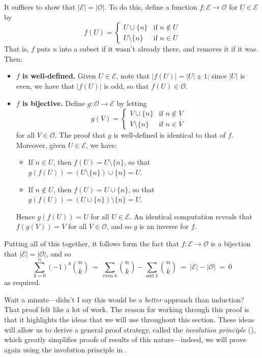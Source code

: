 \begin{cproof}
It suffices to show that $|\mathcal{E}| = |\mathcal{O}|$. To do this, define a function $f : \mathcal{E} \to \mathcal{O}$ for $U \in \mathcal{E}$ by
\[ f(U) = \begin{cases} U \cup \{ n \} & \text{if $n \not\in U$} \\ U \setminus \{ n \} & \text{if $n \in U$} \end{cases} \]
That is, $f$ puts $n$ into a subset if it wasn't already there, and removes it if it was. Then:
\begin{itemize}
\item \textbf{$f$ is well-defined.} Given $U \in \mathcal{E}$, note that $|f(U)| = |U| \pm 1$; since $|U|$ is even, we have that $|f(U)|$ is odd, so that $f(U) \in \mathcal{O}$.
\item \textbf{$f$ is bijective.} Define $g : \mathcal{O} \to \mathcal{E}$ by letting
\[ g(V) = \begin{cases} V \cup \{ n \} & \text{if $n \not\in V$} \\ V \setminus \{ n \} & \text{if $n \in V$} \end{cases} \]
for all $V \in \mathcal{O}$. The proof that $g$ is well-defined is identical to that of $f$. Moreover, given $U \in \mathcal{E}$, we have:
\begin{itemize}
\item If $n \in U$, then $f(U) = U \setminus \{ n \}$, so that $g(f(U)) = (U \setminus \{ n \}) \cup \{ n \} = U$.
\item If $n \not\in U$, then $f(U) = U \cup \{ n \}$, so that $g(f(U)) = (U \cup \{ n \}) \setminus \{ n \} = U$.
\end{itemize}
Hence $g(f(U)) = U$ for all $U \in \mathcal{E}$. An identical computation reveals that $f(g(V)) = V$ for all $V \in \mathcal{O}$, and so $g$ is an inverse for $f$.
\end{itemize}

Putting all of this together, it follows form the fact that $f : \mathcal{E} \to \mathcal{O}$ is a bijection that $|\mathcal{E}| = |\mathcal{O}|$, and so
\[ \sum_{k=0}^n (-1)^k \binom{n}{k} ~=~ \sum_{\text{even } k} \binom{n}{k} - \sum_{\text{odd } k } \binom{n}{k} ~=~ |\mathcal{E}| - |\mathcal{O}| ~=~ 0 \]
as required.
\end{cproof}

Wait a minute---didn't I say this would be a \textit{better} approach than induction? That proof felt like a lot of work. The reason for working through this proof is that it highlights the ideas that we will use throughout this section. These ideas will allow us to derive a general proof strategy, called the \textit{involution principle} (), which greatly simplifies proofs of results of this nature---indeed, we will prove  again using the involution principle in .

